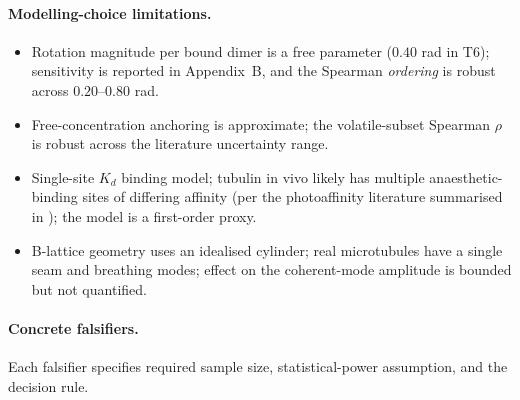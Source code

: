 \documentclass[11pt,a4paper]{article}
\begin{document}
\paragraph{Modelling-choice limitations.}
\begin{itemize}\itemsep0pt
  \item Rotation magnitude per bound dimer is a free parameter ($0.40$ rad in
    \textsf{T6}); sensitivity is reported in Appendix~B, and the Spearman
    \emph{ordering} is robust across $0.20$--$0.80$ rad.
  \item Free-concentration anchoring is approximate; the volatile-subset
    Spearman $\rho$ is robust across the literature uncertainty range.
  \item Single-site $K_d$ binding model; tubulin in vivo likely has
    multiple anaesthetic-binding sites of differing affinity (per
    the photoaffinity literature summarised in \citet{Eckenhoff1993});
    the model is a first-order proxy.
  \item B-lattice geometry uses an idealised cylinder; real microtubules
    have a single seam and breathing modes; effect on the
    coherent-mode amplitude is bounded but not quantified.
\end{itemize}

\paragraph{Concrete falsifiers.}
Each falsifier specifies required sample size, statistical-power
assumption, and the decision rule.
\end{document}
